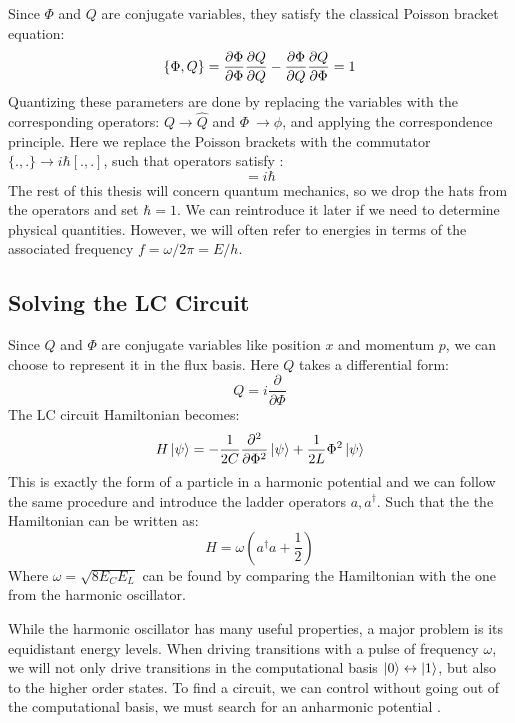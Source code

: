 Since $\Phi$ and $Q$ are conjugate variables, they satisfy the classical Poisson bracket equation:
\begin{equation}
    \{ \Phi, Q\} = \frac{\partial \Phi}{\partial \Phi}\frac{\partial Q}{\partial Q} - \frac{\partial \Phi}{\partial Q}\frac{\partial Q}{\partial \Phi} = 1
\end{equation}
Quantizing these parameters are done by replacing the variables with the corresponding operators: $Q \to \hat{Q}$ and $\Phi \ \to \phi$, and applying the correspondence principle. Here we replace the Poisson brackets with the commutator $\{., .\} \to i\hbar[., .]$, such that operators satisfy \cite{krantz_quantum_2019}:
\begin{equation}
    [\phi, \hat{Q}] = i\hbar
\end{equation}
The rest of this thesis will concern quantum mechanics, so we drop the hats from the operators and set $\hbar = 1$. We can reintroduce it later if we need to determine physical quantities. However, we will often refer to energies in terms of the associated frequency $f = \omega/2\pi = E / h$. 

\subsection{Solving the LC Circuit}\label{sec:forming_qubits}
Since $Q$ and $\Phi$ are conjugate variables like position $x$ and momentum $p$, we can choose to represent it in the flux basis. Here $Q$ takes a differential form:
\begin{equation}
    Q = i\frac{\partial}{\partial \Phi}
\end{equation}
The LC circuit Hamiltonian becomes:
\begin{equation}
    H \ket{\psi} = - \frac{1}{2C} \frac{\partial^2 }{\partial \Phi^2}\ket{\psi} + \frac{1}{2L} \Phi^2 \ket{\psi}
\end{equation}
This is exactly the form of a particle in a harmonic potential and we can follow the same procedure and introduce the ladder operators $a, a^\dagger$. Such that the the Hamiltonian can be written as:
\begin{equation}
    H = \omega \left(a^\dagger a + \frac12\right)
\end{equation}
Where $\omega = \sqrt{8 E_C E_L}$ can be found by comparing the Hamiltonian with the one from the harmonic oscillator.

While the harmonic oscillator has many useful properties, a major problem is its equidistant energy levels. When driving transitions with a pulse of frequency $\omega$, we will not only drive transitions in the computational basis $\ket{0} \leftrightarrow\ket{1}$, but also to the higher order states. To find a circuit, we can control without going out of the computational basis, we must search for an anharmonic potential \cite{krantz_quantum_2019}.

